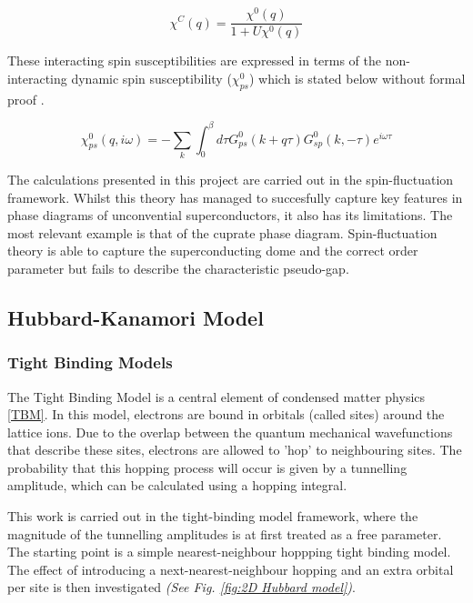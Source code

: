 \documentclass[12pt]{article}
\begin{document}
\begin{equation}
    \chi^C(q) = \frac{\chi^0(q)}{1 + U \chi^0 (q)}
\end{equation}

\noindent These interacting spin susceptibilities are expressed in terms of the non-interacting dynamic spin susceptibility ($\chi_{ps}^0$) which is stated below without formal proof \cite{moriya2000spin}. 

\begin{equation}\label{chi 0}
    \chi_{ps}^0(q, i \omega) = -\sum_{k} \int_{0}^{\beta} d\tau G^0_{ps}(k+q \tau) G^0_{sp}(k, -\tau)e^{i\omega \tau}
\end{equation} 

\noindent The calculations presented in this project are carried out in the spin-fluctuation framework. 
Whilst this theory has managed to succesfully capture key features in phase diagrams of unconvential superconductors, it also has its limitations.
The most relevant example is that of the cuprate phase diagram.
Spin-fluctuation theory is able to capture the superconducting dome and the correct order parameter \cite{moriya2006developments, scalapino1995case} 
but fails
to describe the characteristic pseudo-gap\cite{timusk1999pseudogap}. 

\subsection{Hubbard-Kanamori Model}

\subsubsection{Tight Binding Models}

The Tight Binding Model is a central element of condensed matter physics \eqref{TBM}. In this model, electrons are bound in orbitals (called sites) around the lattice ions.
Due to the overlap between the quantum mechanical wavefunctions that describe these sites, electrons are allowed to 'hop' to neighbouring sites. The probability that this hopping process will occur is given by a tunnelling amplitude, which can be calculated using a hopping integral. \par
\medskip
\noindent This work is carried out in the tight-binding model framework, where the magnitude of the tunnelling amplitudes is at first treated as a free parameter. 
The starting point is a simple nearest-neighbour hoppping tight binding model. 
The effect of introducing a next-nearest-neighbour hopping and an extra orbital per site
is then investigated \textit{(See Fig. \ref{fig:2D Hubbard model})}.
\end{document}
